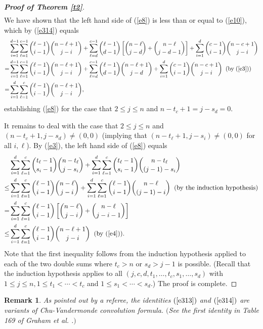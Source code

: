 \documentclass[12pt, A4paper, oneside]{article}
\theoremstyle{plain}
\newtheorem{rem}{Remark}[section]
\numberwithin{equation}{section}
\begin{document}
\begin{proof}[\bf Proof of Theorem \ref{t2}]
\begin{align}
\end{align}
We have shown that  the left hand side of (\ref{e8}) is less than  or equal to (\ref{e10}), which by (\ref{e314}) equals
\begin{align*}
&\sum_{i=1}^{d-1}\sum_{\ell=1}^{c-1}{\ell-1\choose i-1}{n-\ell+1\choose j-i}+\sum_{\ell=d}^{c-1}{\ell-1\choose d-1}\left[{n-\ell\choose
j-d}+{n-\ell\choose j-d-1}\right]+\sum_{i=1}^{d}{c-1\choose i-1}{n-c+1\choose j-i}\\
=&\sum_{i=1}^{d-1}\sum_{\ell=1}^{c-1}{\ell-1\choose i-1}{n-\ell+1\choose j-i}+\sum_{\ell=d}^{c-1}{\ell-1\choose d-1}{n-\ell+1\choose
j-d}+\sum_{i=1}^{d}{c-1\choose i-1}{n-c+1\choose j-i}\;\;\mbox{(by\;(\ref{e3}))}\\
=&\sum_{i=1}^d\sum_{\ell=1}^c{\ell-1\choose i-1}{n-\ell+1\choose j-i},
\end{align*}
establishing (\ref{e8}) for the case that $2\le j \le n$ and $n-t_c+1=j-s_d=0$.


It remains to deal with the case that $2\le j\le n$ and $(n-t_c+1,j-s_d)\neq(0,0)$
(implying that $(n-t_\ell+1,j-s_i) \ne (0,0)$ for all $i, \ell$). By (\ref{e3}), the left hand side of (\ref{e8}) equals
\begin{align*}
&\sum_{i=1}^d\sum_{\ell=1}^c{t_\ell-1\choose s_i-1}{n-t_\ell\choose j-s_i}+\sum_{i=1}^d\sum_{\ell=1}^c
{t_\ell-1\choose s_i-1}{n-t_\ell\choose (j-1)-s_i}\\
\le&\sum_{i=1}^d\sum_{\ell=1}^c{\ell-1\choose i-1}{n-\ell\choose j-i}+\sum_{i=1}^d\sum_{\ell=1}^c{\ell-1\choose i-1}{n-\ell\choose (j-1)-i}\;\;\mbox{(by the induction hypothesis)}\\
=&\sum_{i=1}^d\sum_{\ell=1}^c{\ell-1\choose i-1}\left[{n-\ell\choose j-i}+{n-\ell\choose j-i-1}\right]\\
\le&\sum_{i=1}^d\sum_{\ell=1}^c{\ell-1\choose i-1}{n-\ell+1\choose j-i}\;\;\mbox{(by (\ref{e4}))}.
\end{align*}
Note that the first inequality follows from the induction hypothesis  applied to each of the two double sums
where $t_c>n$ or $s_d>j-1$ is possible. (Recall that the induction hypothesis applies to all
$(j,c,d,t_1,\dots,t_c,s_1,\dots,s_d)$ with $1\le j\le n, 1\le t_1<\cdots<t_c$ and $1\le s_1<\cdots<s_d$.) The proof is complete.
\end{proof}


\begin{rem}
As pointed out by a referee, the identities $(\ref{e313})$ and $(\ref{e314})$ are variants of Chu-Vandermonde convolution formula. $($See the first identity in Table 169 of Graham et al. \cite{ref0}.$)$
\end{rem}
\end{document}

